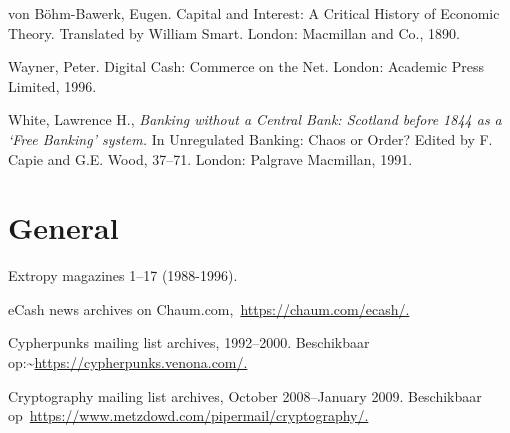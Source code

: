 \documentclass[smalldemyvopaper,11pt,twoside,onecolumn,openright,extrafontsizes,hidelinks]{memoir}
\begin{document}
von Böhm-Bawerk, Eugen. Capital and Interest: A Critical History of
Economic Theory. Translated by William Smart. London: Macmillan and Co.,
1890.

Wayner, Peter. Digital Cash: Commerce on the Net. London: Academic Press
Limited, 1996.

White, Lawrence H., \emph{Banking without a Central Bank: Scotland
before 1844 as a `Free Banking' system.} In Unregulated Banking: Chaos
or Order? Edited by F. Capie and G.E. Wood, 37--71. London: Palgrave
Macmillan, 1991.

\section*{General}\label{general}


Extropy magazines 1--17 (1988-1996).

eCash news archives on
Chaum.com,~\href{https://chaum.com/ecash/}{https://chaum.com/ecash/.}

Cypherpunks mailing list archives, 1992--2000. Beschikbaar
op:\textasciitilde{}\href{https://cypherpunks.venona.com/}{https://cypherpunks.venona.com/.}

Cryptography mailing list archives, October 2008--January 2009.
Beschikbaar
op~\href{https://www.metzdowd.com/pipermail/cryptography/}{https://www.metzdowd.com/pipermail/cryptography/.}


\backmatter
\end{document}
